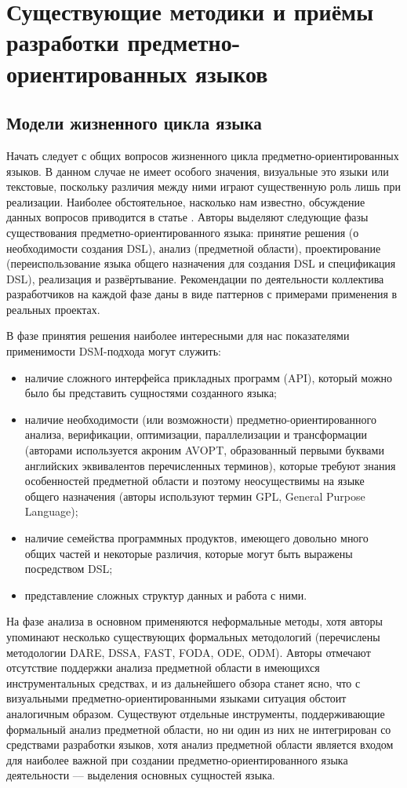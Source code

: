 \section{Существующие методики и приёмы разработки предметно-ориентированных языков}
\subsection{Модели жизненного цикла языка}
\label{lifecycleModels}
Начать следует с общих вопросов жизненного цикла предметно-ориентированных языков.
В данном случае не имеет особого значения, визуальные это языки или текстовые, поскольку
различия между ними играют существенную роль лишь при реализации. Наиболее обстоятельное,
насколько нам известно, обсуждение данных вопросов приводится в статье \cite{mernik2005and}. 
Авторы выделяют следующие фазы существования предметно-ориентированного языка: принятие 
решения (о необходимости создания DSL), анализ (предметной области), проектирование 
(переиспользование языка общего назначения для создания DSL и спецификация DSL), реализация 
и развёртывание. Рекомендации по деятельности коллектива разработчиков на каждой фазе 
даны в виде паттернов с примерами применения в реальных проектах. 

В фазе принятия решения наиболее интересными для нас показателями применимости DSM-подхода могут служить: 
\begin{itemize}
	\item наличие сложного интерфейса прикладных программ (API), который можно было 
		бы представить сущностями созданного языка;
	\item наличие необходимости (или возможности) предметно-ориентированного анализа, 
		верификации, оптимизации, параллелизации и трансформации (авторами используется 
		акроним AVOPT, образованный первыми буквами английских эквивалентов перечисленных 
		терминов), которые требуют знания особенностей предметной области и поэтому неосуществимы 
		на языке общего назначения (авторы используют термин GPL, General Purpose Language);
	\item наличие семейства программных продуктов, имеющего довольно много общих частей 
		и некоторые различия, которые могут быть выражены посредством DSL;
	\item представление сложных структур данных и работа с ними.
\end{itemize}

На фазе анализа в основном применяются неформальные методы, хотя авторы упоминают 
несколько существующих формальных методологий (перечислены методологии
DARE, DSSA, FAST, FODA, ODE, ODM). Авторы отмечают отсутствие поддержки анализа предметной 
области в имеющихся инструментальных средствах, и из дальнейшего обзора станет ясно, 
что с визуальными предметно-ориентированными языками ситуация обстоит аналогичным 
образом. Существуют отдельные инструменты, поддерживающие формальный анализ предметной 
области, но ни один из них не интегрирован со средствами разработки языков, хотя анализ 
предметной области является входом для наиболее важной при создании предметно-ориентированного 
языка деятельности –-- выделения основных сущностей языка.

